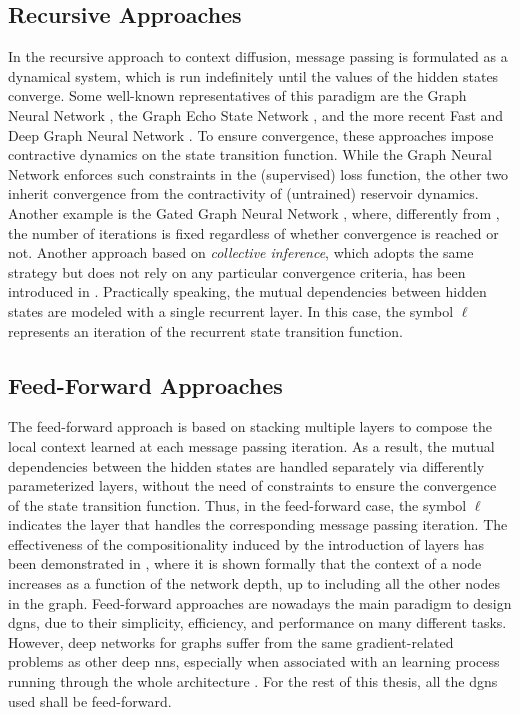 \subsection{Recursive Approaches}
In the recursive approach to context diffusion, message passing is formulated as a dynamical system, which is run indefinitely until the values of the hidden states converge. Some well-known representatives of this paradigm are the Graph Neural Network \citep{scarselli2009gnn}, the Graph Echo State Network \citep{gallicchio2010graphesn}, and the more recent Fast and Deep Graph Neural Network \citep{gallicchio2020fastdeepgnn}. To ensure convergence, these approaches impose contractive dynamics on the state transition function. While the Graph Neural Network enforces such constraints in the (supervised) loss function, the other two inherit convergence from the contractivity of (untrained) reservoir dynamics. Another example is the Gated Graph Neural Network \citep{li2016gatedgnn}, where, differently from \citep{scarselli2009gnn}, the number of iterations is fixed \apriori regardless of whether convergence is reached or not. Another approach based on \emph{collective inference}, which adopts the same strategy but does not rely on any particular convergence criteria, has been introduced in \citep{macskassy2007classificationnetworkdata}. Practically speaking, the mutual dependencies between hidden states are modeled with a single recurrent layer. In this case, the symbol $\ell$ represents an iteration of the recurrent state transition function.

\subsection{Feed-Forward Approaches}
The feed-forward approach is based on stacking multiple layers to compose the local context learned at each message passing iteration. As a result, the mutual dependencies between the hidden states are handled separately via differently parameterized layers, without the need of constraints to ensure the convergence of the state transition function. Thus, in the feed-forward case, the symbol $\ell$ indicates the layer that handles the corresponding message passing iteration. The effectiveness of the compositionality induced by the introduction of layers has been demonstrated in \citep{micheli2009nn4g}, where it is shown formally that the context of a node increases as a function of the network depth, up to including all the other nodes in the graph. Feed-forward approaches are nowadays the main paradigm to design \glspl{dgn}, due to their simplicity, efficiency, and performance on many different tasks. However, deep networks for graphs suffer from the same gradient-related problems as other deep \glspl{nn}, especially when associated with an  learning process running through the whole architecture \citep{bengio1994learninglongtermdependenciesdifficult,li2018deeperinsightgraphconvsemisupervised}. For the rest of this thesis, all the \glspl{dgn} used shall be feed-forward.

